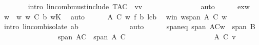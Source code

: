 \begin{isabellebody}
\ \ \ \ \ \ \isamarkupfalse%
\ {\isacharparenleft}intro\ lincomb{\isacharunderscore}must{\isacharunderscore}include{\isacharbrackleft}\ {\isacharquery}T{\isacharequal}{\isachardoublequoteopen}A{\isasymunion}C{\isacharprime}{\isachardoublequoteclose}\ \ {\isacharquery}v{\isacharequal}{\isachardoublequoteopen}v{\isachardoublequoteclose}{\isacharbrackright}{\isacharparenright}\isanewline
\ \ \ \ \ \ \ \ \ \ \ \ \ \ \isamarkupfalse%
\ auto\isanewline
\ \ \ \ \isamarkupfalse%
\ exw\ \isamarkupfalse%
\ w\ \ w{\isacharcolon}\ {\isachardoublequoteopen}w{\isasymin}\ C{\isacharprime}{\isachardoublequoteclose}\ {\isachardoublequoteopen}{\isacharquery}b\ w{\isasymnoteq}{\isasymzero}\isactrlbsub K\isactrlesub {\isachardoublequoteclose}\ \isamarkupfalse%
\ auto\isanewline
\ \ \ \ \isamarkupfalse%
\ A\ C{\isacharprime}\ w\ f\ b\ lcb\ \isamarkupfalse%
\ w{\isacharunderscore}in{\isacharcolon}\ {\isachardoublequoteopen}w{\isasymin}span\ {\isacharparenleft}{\isacharparenleft}A{\isasymunion}\ C{\isacharprime}{\isacharparenright}\ {\isacharminus}{\isacharbraceleft}w{\isacharbraceright}{\isacharparenright}{\isachardoublequoteclose}\ \isanewline
\ \ \ \ \ \ \isamarkupfalse%
\ {\isacharparenleft}intro\ lincomb{\isacharunderscore}isolate{\isacharbrackleft}\ a{\isacharequal}{\isachardoublequoteopen}{\isacharquery}b{\isachardoublequoteclose}{\isacharbrackright}{\isacharparenright}\ \isanewline
\ \ \ \ \ \ \ \ \ \ \ \isamarkupfalse%
\ auto\isanewline
\ \ \ \ \isamarkupfalse%
\ spaneq{}{\isacharcolon}\ {\isachardoublequoteopen}span\ {\isacharparenleft}A{\isasymunion}{\isacharparenleft}C{\isacharprime}{\isacharminus}{\isacharbraceleft}w{\isacharbraceright}{\isacharparenright}{\isacharparenright}\ {\isacharequal}\ span\ B{\isachardoublequoteclose}\isanewline
\ \ \ \ \isamarkupfalse%
\ {\isacharminus}\ \isanewline
\ \ \ \ \ \ \isamarkupfalse%
\ {}{\isacharcolon}\ {\isachardoublequoteopen}span\ {\isacharparenleft}{\isacharquery}A{\isacharprime}{\isasymunion}C{\isacharprime}{\isacharparenright}\ {\isacharequal}\ span\ {\isacharparenleft}A{\isasymunion}\ C{\isacharprime}{\isacharparenright}{\isachardoublequoteclose}\ \isanewline
\ \ \ \ \ \ \ \ \isamarkupfalse%
\ {\isacharminus}\ \isanewline
\ \ \ \ \ \ \ \ \ \ \isamarkupfalse%
\ A\ C{\isacharprime}\ v\ \isamarkupfalse%

\end{isabellebody}
